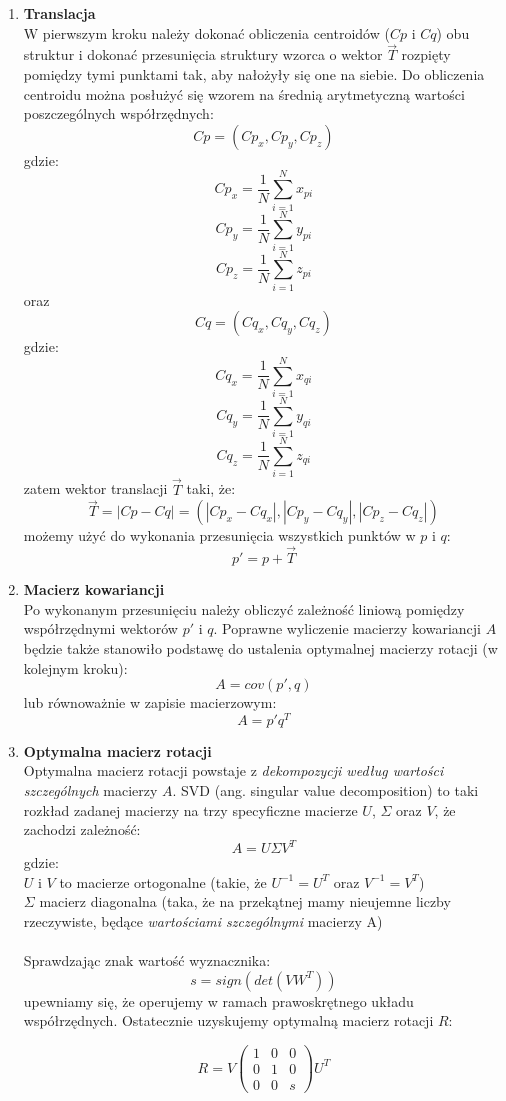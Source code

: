 \documentclass[licencjacka]{pracamgr}
\begin{document}
\begin{enumerate}
\item \textbf{Translacja} \\
W pierwszym kroku należy dokonać obliczenia centroidów ($Cp$ i $Cq$) obu struktur i dokonać przesunięcia struktury wzorca o wektor $\vec{T}$ rozpięty pomiędzy tymi punktami tak, aby nałożyły się one na siebie. Do obliczenia centroidu można posłużyć się wzorem na średnią arytmetyczną wartości poszczególnych współrzędnych: 
$$Cp = (Cp_x, Cp_y, Cp_z)$$
gdzie:
$$Cp_x = \frac{1}{N}\sum_{i=1}^{N}{x_{pi}}$$
$$Cp_y = \frac{1}{N}\sum_{i=1}^{N}{y_{pi}}$$
$$Cp_z = \frac{1}{N}\sum_{i=1}^{N}{z_{pi}}$$
oraz
$$Cq = (Cq_x, Cq_y, Cq_z)$$
gdzie:
$$Cq_x = \frac{1}{N}\sum_{i=1}^{N}{x_{qi}}$$
$$Cq_y = \frac{1}{N}\sum_{i=1}^{N}{y_{qi}}$$
$$Cq_z = \frac{1}{N}\sum_{i=1}^{N}{z_{qi}}$$
zatem wektor translacji $\vec{T}$ taki, że:
$$ \vec{T} = |Cp-Cq| =(|Cp_x-Cq_x|,|Cp_y-Cq_y|,|Cp_z-Cq_z|)$$
możemy użyć do wykonania przesunięcia wszystkich punktów w $p$ i $q$:
$$p'=p+\vec{T}$$
\item \textbf{Macierz kowariancji} \\
Po wykonanym przesunięciu należy obliczyć zależność liniową pomiędzy współrzędnymi wektorów $p'$ i $q$. Poprawne wyliczenie macierzy kowariancji $A$ będzie także stanowiło podstawę do ustalenia optymalnej macierzy rotacji (w kolejnym kroku):
$$ 
A=cov(p',q)
$$
lub równoważnie w zapisie macierzowym:
$$
 A = p'q^T
$$

\item \textbf{Optymalna macierz rotacji} \\
Optymalna macierz rotacji powstaje z \textit{dekompozycji według wartości szczególnych} macierzy $A$. SVD (ang. singular value decomposition) to taki rozkład zadanej macierzy na trzy specyficzne macierze $U$, $\Sigma$ oraz $V$, że zachodzi zależność:
$$
A=U \Sigma V^T
$$
gdzie:
\\
$U$ i $V$ to macierze ortogonalne (takie, że $U^{-1}=U^{T}$ oraz $V^{-1}=V^{T}$)
\\
$\Sigma$ macierz diagonalna (taka, że na przekątnej mamy nieujemne liczby rzeczywiste, będące \textit{wartościami szczególnymi} macierzy A)
\\
\\
Sprawdzając znak wartość wyznacznika:
$$
s=sign(det(VW^T))
$$
upewniamy się, że operujemy w ramach prawoskrętnego układu współrzędnych. Ostatecznie uzyskujemy optymalną macierz rotacji $R$:

$$
R=V
\begin{pmatrix}
 1 & 0 & 0 \\
 0 & 1 & 0 \\
 0 & 0 & s
\end{pmatrix}
U^T
$$

\end{enumerate}
\end{document}
